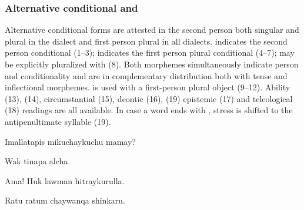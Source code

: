 \subsubsection{Alternative conditional  and }\label{ssec:altcond}
Alternative conditional forms are attested in the second person both singular and plural in the \AMV{} dialect and first person plural in all dialects.  indicates the second person conditional (1--3);  indicates the first person plural conditional (4--7);  may be explicitly pluralized with  (8). Both morphemes simultaneously indicate person and conditionality and are in complementary distribution both with tense and inflectional morphemes.  is used with a first-person plural object (9--12). Ability (13), (14), circumstantial (15), deontic (16), (19) epistemic (17) and teleological (18) readings are all available. In case a word ends with , stress is shifted to the antipenultimate syllable (19).

%
{\textquestiondown{}Imallatapis mikuchaykuchu mamay?}%
{}%
{}{}%

%
{Wak tinapa alcha.}%
{}%
{}{}%

%
{\textexclamdown{}Ama! Huk lawman hitraykurulla.}%
{}%
{}{}%

%
{Ratu ratum chaywanqa shinkaru.}%
{}%
{}{}%

